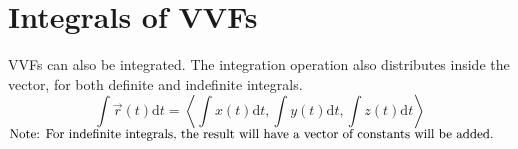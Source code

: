 \section{Integrals of VVFs}
VVFs can also be integrated. The integration operation also distributes inside the vector, for both definite and indefinite integrals.
$$\int{\vec{r}(t)\mathrm{d}t}=\left<\int{x(t)\mathrm{d}t},\int{y(t)\mathrm{d}t},\int{z(t)\mathrm{d}t}\right>$$
$\small{\text{Note: For indefinite integrals, the result will have a vector of constants will be added.}}$